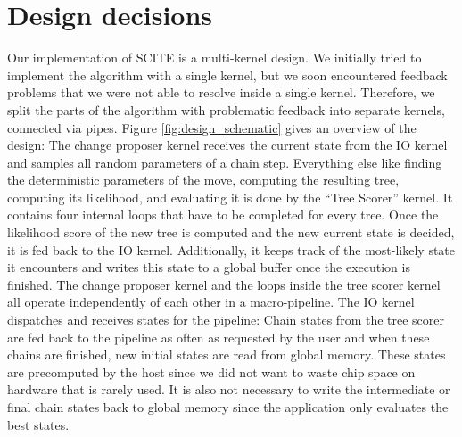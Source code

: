 \chapter{Design decisions}
\label{ch:design}

Our implementation of \ac{SCITE} is a multi-kernel design. We initially tried to implement the algorithm with a single kernel, but we soon encountered feedback problems that we were not able to resolve inside a single kernel. Therefore, we split the parts of the algorithm with problematic feedback into separate kernels, connected via pipes. Figure \ref{fig:design_schematic} gives an overview of the design: The change proposer kernel receives the current state from the IO kernel and samples all random parameters of a chain step. Everything else like finding the deterministic parameters of the move, computing the resulting tree, computing its likelihood, and evaluating it is done by the ``Tree Scorer'' kernel. It contains four internal loops that have to be completed for every tree. Once the likelihood score of the new tree is computed and the new current state is decided, it is fed back to the IO kernel. Additionally, it keeps track of the most-likely state it encounters and writes this state to a global buffer once the execution is finished. The change proposer kernel and the loops inside the tree scorer kernel all operate independently of each other in a macro-pipeline. The IO kernel dispatches and receives states for the pipeline: Chain states from the tree scorer are fed back to the pipeline as often as requested by the user and when these chains are finished, new initial states are read from global memory. These states are precomputed by the host since we did not want to waste chip space on hardware that is rarely used. It is also not necessary to write the intermediate or final chain states back to global memory since the application only evaluates the best states.

